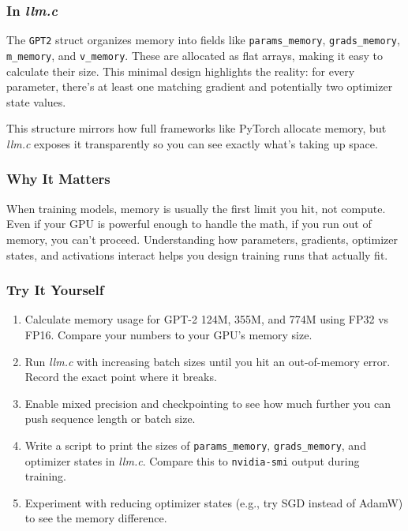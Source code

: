 \documentclass[
  letterpaper,
  DIV=11,
  numbers=noendperiod]{scrreprt}
\providecommand{\tightlist}{%
  \setlength{\itemsep}{0pt}\setlength{\parskip}{0pt}}
\begin{document}
\subsubsection{\texorpdfstring{In
\emph{llm.c}}{In llm.c}}\label{in-llm.c}

The \texttt{GPT2} struct organizes memory into fields like
\texttt{params\_memory}, \texttt{grads\_memory}, \texttt{m\_memory}, and
\texttt{v\_memory}. These are allocated as flat arrays, making it easy
to calculate their size. This minimal design highlights the reality: for
every parameter, there's at least one matching gradient and potentially
two optimizer state values.

This structure mirrors how full frameworks like PyTorch allocate memory,
but \emph{llm.c} exposes it transparently so you can see exactly what's
taking up space.

\subsubsection{Why It Matters}\label{why-it-matters-43}

When training models, memory is usually the first limit you hit, not
compute. Even if your GPU is powerful enough to handle the math, if you
run out of memory, you can't proceed. Understanding how parameters,
gradients, optimizer states, and activations interact helps you design
training runs that actually fit.

\subsubsection{Try It Yourself}\label{try-it-yourself-55}

\begin{enumerate}
\def\labelenumi{\arabic{enumi}.}
\tightlist
\item
  Calculate memory usage for GPT-2 124M, 355M, and 774M using FP32 vs
  FP16. Compare your numbers to your GPU's memory size.
\item
  Run \emph{llm.c} with increasing batch sizes until you hit an
  out-of-memory error. Record the exact point where it breaks.
\item
  Enable mixed precision and checkpointing to see how much further you
  can push sequence length or batch size.
\item
  Write a script to print the sizes of \texttt{params\_memory},
  \texttt{grads\_memory}, and optimizer states in \emph{llm.c}. Compare
  this to \texttt{nvidia-smi} output during training.
\item
  Experiment with reducing optimizer states (e.g., try SGD instead of
  AdamW) to see the memory difference.
\end{enumerate}
\end{document}

